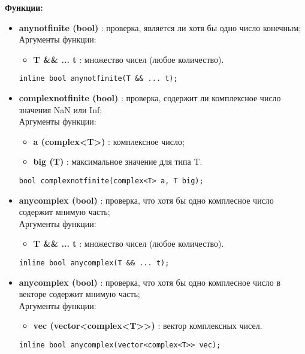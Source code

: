 \documentclass[a4paper,12pt]{article}
\begin{document}
\textbf{Функции:}
\begin{itemize}
    \item \textbf{anynotfinite (bool)} : проверка, является ли хотя бы одно число конечным;
    \\Аргументы функции:
    \begin{itemize}
        \renewcommand{\labelitemi}{-}
        \item \textbf{T \&\& ... t } : множество чисел (любое количество).
    \end{itemize}
    \begin{lstlisting}[language=С++]
inline bool anynotfinite(T && ... t); \end{lstlisting}

    \item \textbf{complexnotfinite (bool)} : проверка, содержит ли комплексное число значения NaN или Inf;
    \\Аргументы функции:
    \begin{itemize}
        \renewcommand{\labelitemi}{-}
        \item \textbf{a (complex<T>)} : комплексное число;
        \item \textbf{big (T)} : максимальное значение для типа T.
    \end{itemize}
    \begin{lstlisting}[language=С++]
bool complexnotfinite(complex<T> a, T big); \end{lstlisting}

    \item \textbf{anycomplex (bool)} : проверка, что хотя бы одно комплесное число содержит мнимую часть;
    \\Аргументы функции:
    \begin{itemize}
        \renewcommand{\labelitemi}{-}
        \item \textbf{T \&\& ... t } : множество чисел (любое количество).
    \end{itemize}
    \begin{lstlisting}[language=С++]
inline bool anycomplex(T && ... t); \end{lstlisting}

    \item \textbf{anycomplex (bool)} : проверка, что хотя бы одно комплесное число в векторе содержит мнимую часть;
    \\Аргументы функции:
    \begin{itemize}
        \renewcommand{\labelitemi}{-}
        \item \textbf{vec (vector<complex<T>>)} : вектор комплексных чисел.
    \end{itemize}
    \begin{lstlisting}[language=С++]
inline bool anycomplex(vector<complex<T>> vec); \end{lstlisting}


\end{itemize}
\end{document}
